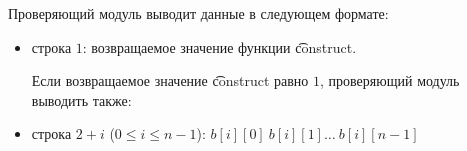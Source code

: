 Проверяющий модуль выводит данные в следующем формате:
\begin{itemize}
\item строка $1$: возвращаемое значение функции \t{construct}.

Если возвращаемое значение \t{construct} равно $1$, проверяющий модуль выводить также:
\item строка $2 + i$ ($0 \leq i \leq n - 1$): $b[i][0]\ b[i][1]\ldots \ b[i][n-1]$
\end{itemize}